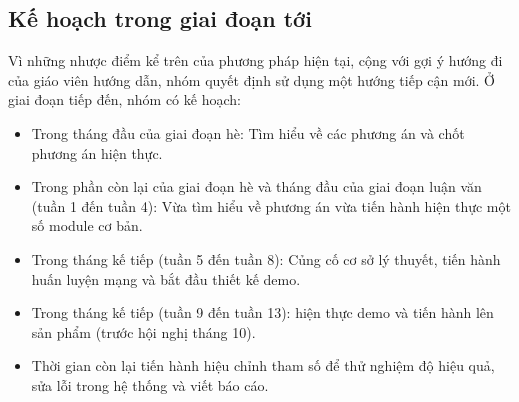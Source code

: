 \documentclass[a4paper,12pt]{article}
\begin{document}
	\subsection{Kế hoạch trong giai đoạn tới}
	Vì những nhược điểm kể trên của phương pháp hiện tại, cộng với gợi ý hướng đi của giáo viên hướng dẫn, nhóm quyết định sử dụng một hướng tiếp cận mới.
	Ở giai đoạn tiếp đến, nhóm có kế hoạch:
	\begin{itemize}
		\item Trong tháng đầu của giai đoạn hè: Tìm hiểu về các phương án và chốt phương án hiện thực.
		\item Trong phần còn lại của giai đoạn hè và tháng đầu của giai đoạn luận văn (tuần 1 đến tuần 4): Vừa tìm hiểu về phương án vừa tiến hành hiện thực một số module cơ bản.
		\item Trong tháng kế tiếp (tuần 5 đến tuần 8): Củng cố cơ sở lý thuyết, tiến hành huấn luyện mạng và bắt đầu thiết kế demo.
		\item Trong tháng kế tiếp (tuần 9 đến tuần 13): hiện thực demo và tiến hành lên sản phẩm (trước hội nghị tháng 10).
		\item Thời gian còn lại tiến hành hiệu chỉnh tham số để thử nghiệm độ hiệu quả, sửa lỗi trong hệ thống và viết báo cáo.
	\end{itemize}
	
	
	
	\newpage
	
	
\end{document}
